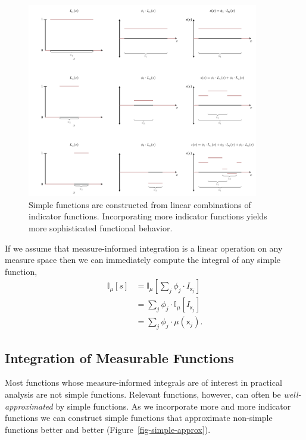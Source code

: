 \documentclass[
  letterpaper,
  DIV=11,
  numbers=noendperiod]{scrartcl}
\begin{document}
\begin{figure}

{\centering \includegraphics[width=0.9\textwidth,height=\textheight]{figures/simple_function/simple_function.pdf}

}

\caption{\label{fig-simple}Simple functions are constructed from linear
combinations of indicator functions. Incorporating more indicator
functions yields more sophisticated functional behavior.}

\end{figure}

If we assume that measure-informed integration is a linear operation on
any measure space then we can immediately compute the integral of any
simple function, \begin{align*}
\mathbb{I}_{\mu}[ s ]
&=
\mathbb{I}_{\mu} \left[ \sum_{j} \phi_{j} \cdot I_{\mathsf{x}_{j}} \right]
\\
&=
\sum_{j} \phi_{j} \cdot \mathbb{I}_{\mu}[ I_{\mathsf{x}_{j}} ]
\\
&=
\sum_{j} \phi_{j} \cdot \mu(\mathsf{x}_{j}).
\end{align*}

\hypertarget{integration-of-measurable-functions}{%
\subsection{Integration of Measurable
Functions}\label{integration-of-measurable-functions}}

Most functions whose measure-informed integrals are of interest in
practical analysis are not simple functions. Relevant functions,
however, can often be \emph{well-approximated} by simple functions. As
we incorporate more and more indicator functions we can construct simple
functions that approximate non-simple functions better and better
(Figure~\ref{fig-simple-approx}).
\end{document}
